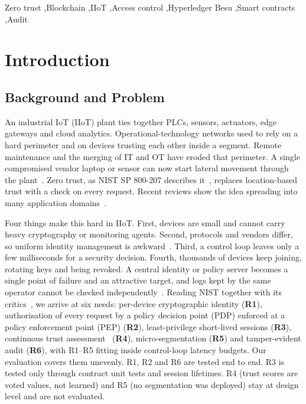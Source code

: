 \documentclass[a4paper,5p,times,twocolumn,number,sort&compress]{elsarticle}
\begin{document}
\begin{frontmatter}
\begin{keyword}
Zero trust \sep Blockchain \sep IIoT \sep Access control \sep Hyperledger Besu \sep Smart contracts \sep Audit
\end{keyword}

\end{frontmatter}

\section{Introduction}

\subsection{Background and Problem}

An industrial IoT (IIoT) plant ties together PLCs, sensors, actuators, edge gateways and cloud analytics. Operational-technology networks used to rely on a hard perimeter and on devices trusting each other inside a segment. Remote maintenance and the merging of IT and OT have eroded that perimeter. A single compromised vendor laptop or sensor can now start lateral movement through the plant~\cite{federici,zanasi}. Zero trust, as NIST SP 800-207 describes it~\cite{nist}, replaces location-based trust with a check on every request. Recent reviews show the idea spreading into many application domains~\cite{gambo,mushtaq,azad}.

Four things make this hard in IIoT. First, devices are small and cannot carry heavy cryptography or monitoring agents. Second, protocols and vendors differ, so uniform identity management is awkward~\cite{mthethwa}. Third, a control loop leaves only a few milliseconds for a security decision. Fourth, thousands of devices keep joining, rotating keys and being revoked. A central identity or policy server becomes a single point of failure and an attractive target, and logs kept by the same operator cannot be checked independently~\cite{mushtaq}. Reading NIST together with its critics~\cite{fernandez}, we arrive at six needs: per-device cryptographic identity (\textbf{R1}), authorisation of every request by a policy decision point (PDP) enforced at a policy enforcement point (PEP) (\textbf{R2}), least-privilege short-lived sessions (\textbf{R3}), continuous trust assessment~\cite{ma} (\textbf{R4}), micro-segmentation (\textbf{R5}) and tamper-evident audit (\textbf{R6}), with R1--R5 fitting inside control-loop latency budgets. Our evaluation covers them unevenly. R1, R2 and R6 are tested end to end. R3 is tested only through contract unit tests and session lifetimes. R4 (trust scores are voted values, not learned) and R5 (no segmentation was deployed) stay at design level and are not evaluated.
\end{document}
